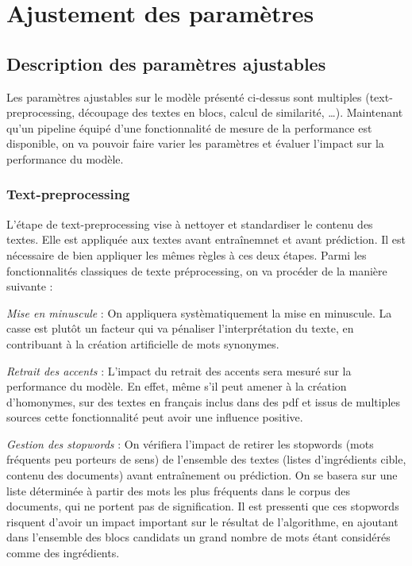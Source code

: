     \chapter{Ajustement des paramètres}
    \label{model_tuning}

        \section{Description des paramètres ajustables}

        Les paramètres ajustables sur le modèle présenté ci-dessus sont multiples (text-preprocessing, découpage des textes en blocs, calcul de similarité, \dots).
        Maintenant qu'un pipeline équipé d'une fonctionnalité de mesure de la performance est disponible, on va pouvoir faire varier les paramètres et évaluer l'impact sur la performance du modèle.

        \subsection{Text-preprocessing}

        L'étape de text-preprocessing vise à nettoyer et standardiser le contenu des textes.
        Elle est appliquée aux textes avant entraînemnet et avant prédiction.
        Il est nécessaire de bien appliquer les mêmes règles à ces deux étapes.
        Parmi les fonctionnalités classiques de texte préprocessing, on va procéder de la manière suivante : 

        \emph{Mise en minuscule} : 
        On appliquera systèmatiquement la mise en minuscule. 
        La casse est plutôt un facteur qui va pénaliser l'interprétation du texte, en contribuant à la création artificielle de mots synonymes.

        \emph{Retrait des accents} : 
        L'impact du retrait des accents sera mesuré sur la performance du modèle.
        En effet, même s'il peut amener à la création d'homonymes, sur des textes en français inclus dans des pdf et issus de multiples sources cette fonctionnalité peut avoir une influence positive.

        \emph{Gestion des stopwords} : 
        On vérifiera l'impact de retirer les stopwords (mots fréquents peu porteurs de sens) de l'ensemble des textes (listes d'ingrédients cible, contenu des documents) avant entraînement ou prédiction.
        On se basera sur une liste déterminée à partir des mots les plus fréquents dans le corpus des documents, qui ne portent pas de signification.
        Il est pressenti que ces stopwords risquent d'avoir un impact important sur le résultat de l'algorithme, en ajoutant dans l'ensemble des blocs candidats un grand nombre de mots étant considérés comme des ingrédients.

